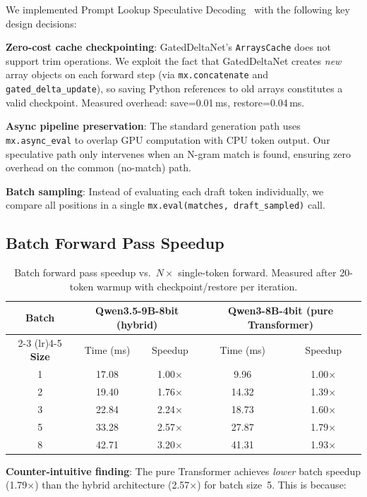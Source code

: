 \documentclass[11pt,a4paper]{article}
\begin{document}
We implemented Prompt Lookup Speculative Decoding~\cite{spec_decoding} with the following key design decisions:

\textbf{Zero-cost cache checkpointing}: GatedDeltaNet's \texttt{ArraysCache} does not support trim operations. We exploit the fact that GatedDeltaNet creates \emph{new} array objects on each forward step (via \texttt{mx.concatenate} and \texttt{gated\_delta\_update}), so saving Python references to old arrays constitutes a valid checkpoint. Measured overhead: save=0.01\,ms, restore=0.04\,ms.

\textbf{Async pipeline preservation}: The standard generation path uses \texttt{mx.async\_eval} to overlap GPU computation with CPU token output. Our speculative path only intervenes when an N-gram match is found, ensuring zero overhead on the common (no-match) path.

\textbf{Batch sampling}: Instead of evaluating each draft token individually, we compare all positions in a single \texttt{mx.eval(matches, draft\_sampled)} call.

\subsection{Batch Forward Pass Speedup}

\begin{table}[H]
\centering
\caption{Batch forward pass speedup vs.\ $N \times$ single-token forward. Measured after 20-token warmup with checkpoint/restore per iteration.}
\label{tab:batch_speedup}
\begin{tabular}{ccccc}
\toprule
\textbf{Batch} & \multicolumn{2}{c}{\textbf{Qwen3.5-9B-8bit (hybrid)}} & \multicolumn{2}{c}{\textbf{Qwen3-8B-4bit (pure Transformer)}} \\
\cmidrule(lr){2-3} \cmidrule(lr){4-5}
\textbf{Size} & Time (ms) & Speedup & Time (ms) & Speedup \\
\midrule
1 & 17.08 & 1.00$\times$ & 9.96 & 1.00$\times$ \\
2 & 19.40 & 1.76$\times$ & 14.32 & 1.39$\times$ \\
3 & 22.84 & 2.24$\times$ & 18.73 & 1.60$\times$ \\
5 & 33.28 & 2.57$\times$ & 27.87 & 1.79$\times$ \\
8 & 42.71 & 3.20$\times$ & 41.31 & 1.93$\times$ \\
\bottomrule
\end{tabular}
\end{table}

\textbf{Counter-intuitive finding}: The pure Transformer achieves \emph{lower} batch speedup (1.79$\times$) than the hybrid architecture (2.57$\times$) for batch size~5. This is because:
\end{document}
